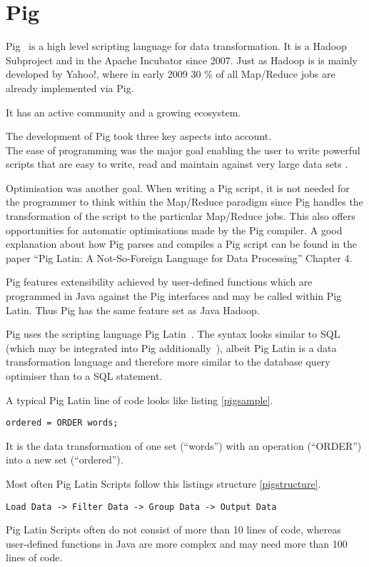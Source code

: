 \section{Pig}

Pig~\cite{pigWebsite}  is a high level scripting language for data transformation. It is a Hadoop Subproject and in the Apache Incubator since 2007. Just as Hadoop is is mainly developed by Yahoo!, where in early 2009 30 \% of all Map/Reduce jobs are already implemented via Pig.%

It has an active community and a growing ecosystem.

The development of Pig took three key aspects into account. \\
The ease of programming was the major goal enabling the user to write powerful scripts that are easy to write, read and maintain against very large data sets .~\cite{pigWebsite}

Optimisation was another goal. When writing a Pig script, it is not needed for the programmer to think within the Map/Reduce paradigm since Pig handles the transformation of the script to the particular Map/Reduce jobs. This also offers opportunities for automatic optimisations made by the Pig compiler. A good explanation about how Pig parses and compiles a Pig script can be found in the paper ``Pig Latin: A Not-So-Foreign Language for Data Processing'' Chapter 4.~\cite{pigNotForeign}

Pig features extensibility achieved by user-defined functions which are programmed in Java against the Pig interfaces and may be called within Pig Latin. Thus Pig has the same feature set as Java Hadoop.

Pig uses the scripting language Pig Latin~\cite{pigManual}. The syntax looks similar to SQL (which may be integrated into Pig additionally~\cite{pigSql}), albeit Pig Latin is a data transformation language and therefore more similar to the database query optimiser than to a SQL statement.

A typical Pig Latin line of code looks like listing \ref{pigsample}.

\begin{lstlisting}[language=pig,caption=A typical Pig line of code,label=pigsample]
ordered = ORDER words;
\end{lstlisting}

It is the data transformation of one set (``words'') with an operation (``ORDER'') into a new set (``ordered'').

Most often Pig Latin Scripts follow this listings structure \ref{pigstructure}.

\begin{lstlisting}[language=pig,caption=Pig Latin Script Structure ,label=pigstructure]
Load Data -> Filter Data -> Group Data -> Output Data
\end{lstlisting}
                                                     
Pig Latin Scripts often do not consist of more than 10 lines of code, whereas user-defined functions in Java are more complex and may need more than 100 lines of code.
                                                                                                               
